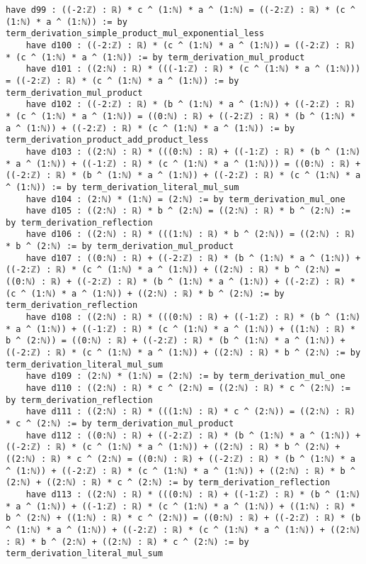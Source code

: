 \documentclass{article}
\begin{document}
\begin{tcolorbox}[colback=white!10, width=\linewidth]
\begin{lstlisting}[language=Lean4]
    have d99 : ((-2:ℤ) : ℝ) * c ^ (1:ℕ) * a ^ (1:ℕ) = ((-2:ℤ) : ℝ) * (c ^ (1:ℕ) * a ^ (1:ℕ)) := by term_derivation_simple_product_mul_exponential_less
    have d100 : ((-2:ℤ) : ℝ) * (c ^ (1:ℕ) * a ^ (1:ℕ)) = ((-2:ℤ) : ℝ) * (c ^ (1:ℕ) * a ^ (1:ℕ)) := by term_derivation_mul_product
    have d101 : ((2:ℕ) : ℝ) * (((-1:ℤ) : ℝ) * (c ^ (1:ℕ) * a ^ (1:ℕ))) = ((-2:ℤ) : ℝ) * (c ^ (1:ℕ) * a ^ (1:ℕ)) := by term_derivation_mul_product
    have d102 : ((-2:ℤ) : ℝ) * (b ^ (1:ℕ) * a ^ (1:ℕ)) + ((-2:ℤ) : ℝ) * (c ^ (1:ℕ) * a ^ (1:ℕ)) = ((0:ℕ) : ℝ) + ((-2:ℤ) : ℝ) * (b ^ (1:ℕ) * a ^ (1:ℕ)) + ((-2:ℤ) : ℝ) * (c ^ (1:ℕ) * a ^ (1:ℕ)) := by term_derivation_product_add_product_less
    have d103 : ((2:ℕ) : ℝ) * (((0:ℕ) : ℝ) + ((-1:ℤ) : ℝ) * (b ^ (1:ℕ) * a ^ (1:ℕ)) + ((-1:ℤ) : ℝ) * (c ^ (1:ℕ) * a ^ (1:ℕ))) = ((0:ℕ) : ℝ) + ((-2:ℤ) : ℝ) * (b ^ (1:ℕ) * a ^ (1:ℕ)) + ((-2:ℤ) : ℝ) * (c ^ (1:ℕ) * a ^ (1:ℕ)) := by term_derivation_literal_mul_sum
    have d104 : (2:ℕ) * (1:ℕ) = (2:ℕ) := by term_derivation_mul_one
    have d105 : ((2:ℕ) : ℝ) * b ^ (2:ℕ) = ((2:ℕ) : ℝ) * b ^ (2:ℕ) := by term_derivation_reflection
    have d106 : ((2:ℕ) : ℝ) * (((1:ℕ) : ℝ) * b ^ (2:ℕ)) = ((2:ℕ) : ℝ) * b ^ (2:ℕ) := by term_derivation_mul_product
    have d107 : ((0:ℕ) : ℝ) + ((-2:ℤ) : ℝ) * (b ^ (1:ℕ) * a ^ (1:ℕ)) + ((-2:ℤ) : ℝ) * (c ^ (1:ℕ) * a ^ (1:ℕ)) + ((2:ℕ) : ℝ) * b ^ (2:ℕ) = ((0:ℕ) : ℝ) + ((-2:ℤ) : ℝ) * (b ^ (1:ℕ) * a ^ (1:ℕ)) + ((-2:ℤ) : ℝ) * (c ^ (1:ℕ) * a ^ (1:ℕ)) + ((2:ℕ) : ℝ) * b ^ (2:ℕ) := by term_derivation_reflection
    have d108 : ((2:ℕ) : ℝ) * (((0:ℕ) : ℝ) + ((-1:ℤ) : ℝ) * (b ^ (1:ℕ) * a ^ (1:ℕ)) + ((-1:ℤ) : ℝ) * (c ^ (1:ℕ) * a ^ (1:ℕ)) + ((1:ℕ) : ℝ) * b ^ (2:ℕ)) = ((0:ℕ) : ℝ) + ((-2:ℤ) : ℝ) * (b ^ (1:ℕ) * a ^ (1:ℕ)) + ((-2:ℤ) : ℝ) * (c ^ (1:ℕ) * a ^ (1:ℕ)) + ((2:ℕ) : ℝ) * b ^ (2:ℕ) := by term_derivation_literal_mul_sum
    have d109 : (2:ℕ) * (1:ℕ) = (2:ℕ) := by term_derivation_mul_one
    have d110 : ((2:ℕ) : ℝ) * c ^ (2:ℕ) = ((2:ℕ) : ℝ) * c ^ (2:ℕ) := by term_derivation_reflection
    have d111 : ((2:ℕ) : ℝ) * (((1:ℕ) : ℝ) * c ^ (2:ℕ)) = ((2:ℕ) : ℝ) * c ^ (2:ℕ) := by term_derivation_mul_product
    have d112 : ((0:ℕ) : ℝ) + ((-2:ℤ) : ℝ) * (b ^ (1:ℕ) * a ^ (1:ℕ)) + ((-2:ℤ) : ℝ) * (c ^ (1:ℕ) * a ^ (1:ℕ)) + ((2:ℕ) : ℝ) * b ^ (2:ℕ) + ((2:ℕ) : ℝ) * c ^ (2:ℕ) = ((0:ℕ) : ℝ) + ((-2:ℤ) : ℝ) * (b ^ (1:ℕ) * a ^ (1:ℕ)) + ((-2:ℤ) : ℝ) * (c ^ (1:ℕ) * a ^ (1:ℕ)) + ((2:ℕ) : ℝ) * b ^ (2:ℕ) + ((2:ℕ) : ℝ) * c ^ (2:ℕ) := by term_derivation_reflection
    have d113 : ((2:ℕ) : ℝ) * (((0:ℕ) : ℝ) + ((-1:ℤ) : ℝ) * (b ^ (1:ℕ) * a ^ (1:ℕ)) + ((-1:ℤ) : ℝ) * (c ^ (1:ℕ) * a ^ (1:ℕ)) + ((1:ℕ) : ℝ) * b ^ (2:ℕ) + ((1:ℕ) : ℝ) * c ^ (2:ℕ)) = ((0:ℕ) : ℝ) + ((-2:ℤ) : ℝ) * (b ^ (1:ℕ) * a ^ (1:ℕ)) + ((-2:ℤ) : ℝ) * (c ^ (1:ℕ) * a ^ (1:ℕ)) + ((2:ℕ) : ℝ) * b ^ (2:ℕ) + ((2:ℕ) : ℝ) * c ^ (2:ℕ) := by term_derivation_literal_mul_sum

\end{lstlisting}
\end{tcolorbox}
\end{document}
